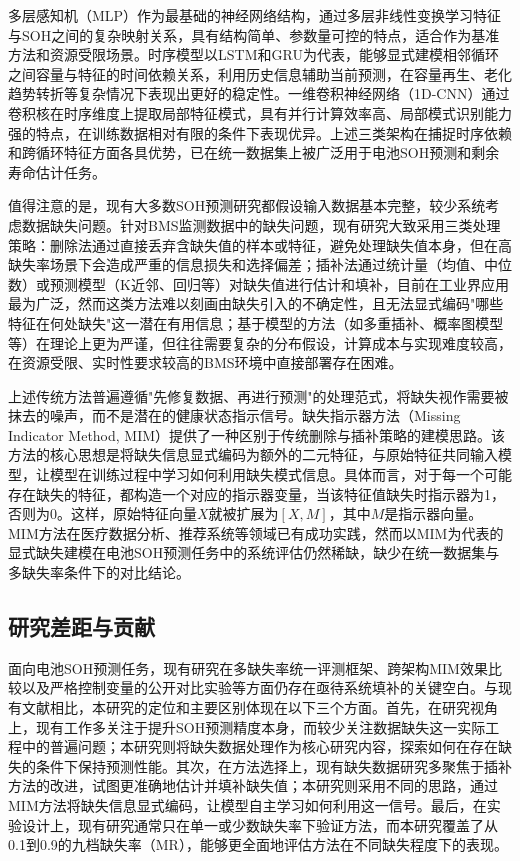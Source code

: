 \documentclass[10pt,a4paper]{ctexart}
\begin{document}
多层感知机（MLP）作为最基础的神经网络结构，通过多层非线性变换学习特征与SOH之间的复杂映射关系，具有结构简单、参数量可控的特点，适合作为基准方法和资源受限场景\cite{bairwa2025cycle}。时序模型以LSTM和GRU为代表，能够显式建模相邻循环之间容量与特征的时间依赖关系，利用历史信息辅助当前预测，在容量再生、老化趋势转折等复杂情况下表现出更好的稳定性。一维卷积神经网络（1D-CNN）通过卷积核在时序维度上提取局部特征模式，具有并行计算效率高、局部模式识别能力强的特点，在训练数据相对有限的条件下表现优异\cite{zhang2024cnnsoh}。上述三类架构在捕捉时序依赖和跨循环特征方面各具优势，已在统一数据集上被广泛用于电池SOH预测和剩余寿命估计任务。

值得注意的是，现有大多数SOH预测研究都假设输入数据基本完整，较少系统考虑数据缺失问题\cite{shao2025soh,deng2025novel}。针对BMS监测数据中的缺失问题，现有研究大致采用三类处理策略：删除法通过直接丢弃含缺失值的样本或特征，避免处理缺失值本身，但在高缺失率场景下会造成严重的信息损失和选择偏差；插补法通过统计量（均值、中位数）或预测模型（K近邻、回归等）对缺失值进行估计和填补，目前在工业界应用最为广泛，然而这类方法难以刻画由缺失引入的不确定性，且无法显式编码"哪些特征在何处缺失"这一潜在有用信息；基于模型的方法（如多重插补、概率图模型等）在理论上更为严谨，但往往需要复杂的分布假设，计算成本与实现难度较高，在资源受限、实时性要求较高的BMS环境中直接部署存在困难。

上述传统方法普遍遵循"先修复数据、再进行预测"的处理范式，将缺失视作需要被抹去的噪声，而不是潜在的健康状态指示信号。缺失指示器方法（Missing Indicator Method, MIM）提供了一种区别于传统删除与插补策略的建模思路。该方法的核心思想是将缺失信息显式编码为额外的二元特征，与原始特征共同输入模型，让模型在训练过程中学习如何利用缺失模式信息。具体而言，对于每一个可能存在缺失的特征，都构造一个对应的指示器变量，当该特征值缺失时指示器为1，否则为0。这样，原始特征向量$X$就被扩展为$[X, M]$，其中$M$是指示器向量。MIM方法在医疗数据分析、推荐系统等领域已有成功实践，然而以MIM为代表的显式缺失建模在电池SOH预测任务中的系统评估仍然稀缺，缺少在统一数据集与多缺失率条件下的对比结论。

\subsection{研究差距与贡献}\label{sec:contributions}

面向电池SOH预测任务，现有研究在多缺失率统一评测框架、跨架构MIM效果比较以及严格控制变量的公开对比实验等方面仍存在亟待系统填补的关键空白。与现有文献相比，本研究的定位和主要区别体现在以下三个方面。首先，在研究视角上，现有工作多关注于提升SOH预测精度本身，而较少关注数据缺失这一实际工程中的普遍问题；本研究则将缺失数据处理作为核心研究内容，探索如何在存在缺失的条件下保持预测性能。其次，在方法选择上，现有缺失数据研究多聚焦于插补方法的改进，试图更准确地估计并填补缺失值；本研究则采用不同的思路，通过MIM方法将缺失信息显式编码，让模型自主学习如何利用这一信号。最后，在实验设计上，现有研究通常只在单一或少数缺失率下验证方法，而本研究覆盖了从0.1到0.9的九档缺失率（MR），能够更全面地评估方法在不同缺失程度下的表现。
\end{document}
